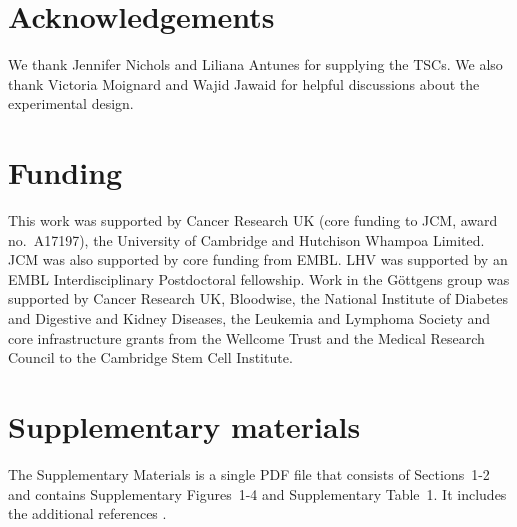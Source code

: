 \documentclass{article}
\newcommand{\suppfigbiophys}{4}
\newcommand{\suppsecsim}{2}
\begin{document}
\section{Acknowledgements}
We thank Jennifer Nichols and Liliana Antunes for supplying the TSCs.
We also thank Victoria Moignard and Wajid Jawaid for helpful discussions about the experimental design.

\section{Funding}
This work was supported by Cancer Research UK (core funding to JCM, award no.\ A17197), the University of Cambridge and Hutchison Whampoa Limited.
JCM was also supported by core funding from EMBL.
LHV was supported by an EMBL Interdisciplinary Postdoctoral fellowship.
Work in the G\"ottgens group was supported by Cancer Research UK, Bloodwise, the National Institute of Diabetes and Digestive and Kidney Diseases, the Leukemia and Lymphoma Society and core infrastructure grants from the Wellcome Trust and the Medical Research Council to the Cambridge Stem Cell Institute.

\section{Supplementary materials}
The Supplementary Materials is a single PDF file that consists of Sections~1-\suppsecsim{} and contains Supplementary Figures~1-\suppfigbiophys{} and Supplementary Table~1.
It includes the additional references \cite{law2014voom,ritchie2015limma}.

{\small


}
\end{document}
